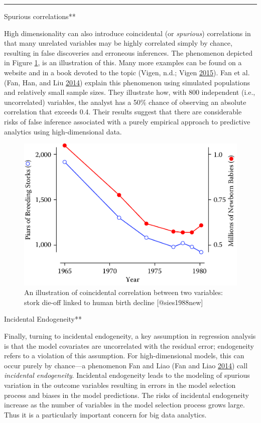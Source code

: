 \documentclass[]{krantz}
\begin{document}
\begin{center}\rule{0.5\linewidth}{\linethickness}\end{center}

Spurious correlations**

High dimensionality can also introduce coincidental (or \emph{spurious})
correlations in that many unrelated variables may be highly correlated
simply by chance, resulting in false discoveries and erroneous
inferences. The phenomenon depicted in Figure \ref{fig:fig10-3}, is an
illustration of this. Many more examples can be found on a website and
in a book devoted to the topic (Vigen, n.d.; Vigen
\protect\hyperlink{ref-spurious2}{2015}). Fan et al. (Fan, Han, and Liu
\protect\hyperlink{ref-fan2014challenges}{2014}) explain this phenomenon
using simulated populations and relatively small sample sizes. They
illustrate how, with 800 independent (i.e., uncorrelated) variables, the
analyst has a 50\% chance of observing an absolute correlation that
exceeds 0.4. Their results suggest that there are considerable risks of
false inference associated with a purely empirical approach to
predictive analytics using high-dimensional data.

\begin{figure}

{\centering \includegraphics[width=0.7\linewidth]{ChapterError/figures/fig10-3} 

}

\caption{An illustration of coincidental correlation between two variables: stork die-off linked to human birth decline [@sies1988new]}\label{fig:fig10-3}
\end{figure}

Incidental Endogeneity**

Finally, turning to incidental endogeneity, a key assumption in
regression analysis is that the model covariates are uncorrelated with
the residual error; endogeneity refers to a violation of this
assumption. For high-dimensional models, this can occur purely by
chance---a phenomenon Fan and Liao (Fan and Liao
\protect\hyperlink{ref-fan2014endogeneity}{2014}) call \emph{incidental
endogeneity}. Incidental endogeneity leads to the modeling of spurious
variation in the outcome variables resulting in errors in the model
selection process and biases in the model predictions. The risks of
incidental endogeneity increase as the number of variables in the model
selection process grows large. Thus it is a particularly important
concern for big data analytics.
\end{document}
